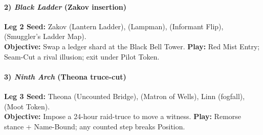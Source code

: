 \paragraph{2) \emph{Black Ladder} (Zakov insertion)}
\textbf{Leg 2 Seed:} Zakov \SuitSpade{} (Lantern Ladder), \SuitHeart{} (Lampman), \SuitClub{} (Informant Flip), \SuitDiamond{} (Smuggler's Ladder Map). \\
\textbf{Objective:} Swap a ledger shard at the Black Bell Tower. \textbf{Play:} Red Mist Entry; Seam-Cut a rival illusion; exit under Pilot Token.

\paragraph{3) \emph{Ninth Arch} (Theona truce-cut)}
\textbf{Leg 3 Seed:} Theona \SuitSpade{} (Uncounted Bridge), \SuitHeart{} (Matron of Wells), Linn \SuitClub{} (fogfall), \SuitDiamond{} (Moot Token). \\
\textbf{Objective:} Impose a 24-hour raid-truce to move a witness. \textbf{Play:} Remorse stance + Name-Bound; any counted step breaks Position.

